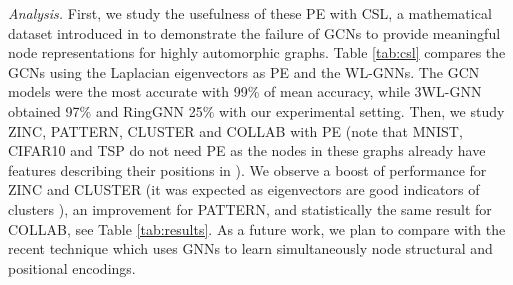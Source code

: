\documentclass{article}
\begin{document}
\vspace{-0.1cm}
{\it Analysis.} First, we study the usefulness of these PE with CSL, a mathematical dataset introduced in \cite{murphy2019relational} to demonstrate the failure of GCNs to provide meaningful node representations for highly automorphic graphs. Table \ref{tab:csl} compares the GCNs using the Laplacian eigenvectors as PE and the WL-GNNs. The GCN models were the most accurate with 99\% of mean accuracy, while 3WL-GNN obtained 97\% and RingGNN 25\% with our experimental setting. Then, we study ZINC, PATTERN, CLUSTER and COLLAB with PE (note that MNIST, CIFAR10 and TSP do not need PE as the nodes in these graphs already have features describing their positions in ). We observe a boost of performance for ZINC and CLUSTER (it was expected as eigenvectors are good indicators of clusters \cite{von2007tutorial}), an improvement for PATTERN, and statistically the same result for COLLAB, see Table \ref{tab:results}. As a future work, we plan to compare with the recent technique \cite{you2019position} which uses GNNs to learn simultaneously node structural and positional encodings.
\end{document}
